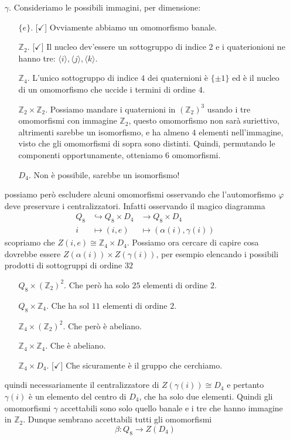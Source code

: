 \begin{multicols}{2}
\begin{itemize}
	 	\item [$ \gamma $.] Consideriamo le possibili immagini, per dimensione:
	 	\begin{itemize}
	 		\item [$\{e\}  $.][$ \checkmark $] Ovviamente abbiamo un omomorfismo banale.
	 		\item [$ \mathbb{Z}_2 $.][$ \checkmark $] Il nucleo dev'essere un sottogruppo di indice 2 e i quaterionioni ne hanno tre: $ \langle i \rangle, \langle j \rangle, \langle k \rangle $.
	 		\item [$ \mathbb{Z}_4 $.] L'unico sottogruppo di indice $ 4 $ dei quaternioni è $ \{\pm 1\} $ ed è il nucleo di un omomorfismo che uccide i termini di ordine $ 4 $.
	 		\item [$ \mathbb{Z}_2\times\mathbb{Z}_2 $.] Possiamo mandare i quaternioni in $ \left(\mathbb{Z}_2\right)^3 $ usando i tre omomorfismi con immagine $ \mathbb{Z}_2 $, questo omomorfismo non sarà suriettivo, altrimenti sarebbe un isomorfismo, e ha almeno $ 4 $ elementi nell'immagine, visto che gli omomorfismi di sopra sono distinti. Quindi, permutando le componenti opportunamente, otteniamo $ 6 $ omomorfismi.
	 		\item [$ D_4 $.] Non è possibile, sarebbe un isomorfismo!
	 	\end{itemize}
	 	possiamo però escludere alcuni omomorfismi osservando che l'automorfismo $ \varphi $ deve preservare i centralizzatori. Infatti osservando il magico diagramma
	 	\begin{align*}
	 		Q_8 &\hookrightarrow Q_8 \times D_4 &\rightarrow Q_8 \times D_4 \\
	 		i &\mapsto (i, e) &\mapsto (\alpha(i), \gamma(i))
	 	\end{align*}
		 scopriamo che $ Z(i, e) \cong \mathbb{Z}_4 \times D_4 $. Possiamo ora cercare di capire cosa dovrebbe essere $ Z(\alpha(i))\times Z(\gamma(i)) $, per esempio elencando i possibili prodotti di sottogruppi di ordine $ 32 $
		 \begin{itemize}
		 	\item [$ Q_8 \times \left(\mathbb{Z}_2\right)^2 $.]
		 	Che però ha solo $ 25 $ elementi di ordine $ 2 $.
		 	\item [$ Q_8 \times \mathbb{Z}_4 $.]
		 	Che ha sol $ 11 $ elementi di ordine $ 2 $.
		 	\item [$ \mathbb{Z}_4 \times \left(\mathbb{Z}_2\right)^2 $.] Che però è abeliano.
		 	\item [$ \mathbb{Z}_4 \times \mathbb{Z}_4 $.] Che è abeliano.
		 	\item [$ \mathbb{Z}_4 \times D_4$.][$ \checkmark $] Che sicuramente è il gruppo che cerchiamo.
		 \end{itemize}
	 quindi necessariamente il centralizzatore di $ Z(\gamma(i)) \cong D_4 $ e pertanto $ \gamma(i) $ è un elemento del centro di $ D_4 $, che ha solo due elementi. Quindi gli omomorfismi $ \gamma $ accettabili sono solo quello banale e i tre che hanno immagine in $ \mathbb{Z}_2 $. Dunque sembrano accettabili tutti gli omomorfismi
	 \[ \beta: Q_8 \to Z(D_4) \]
	 

\end{itemize}
\end{multicols}
